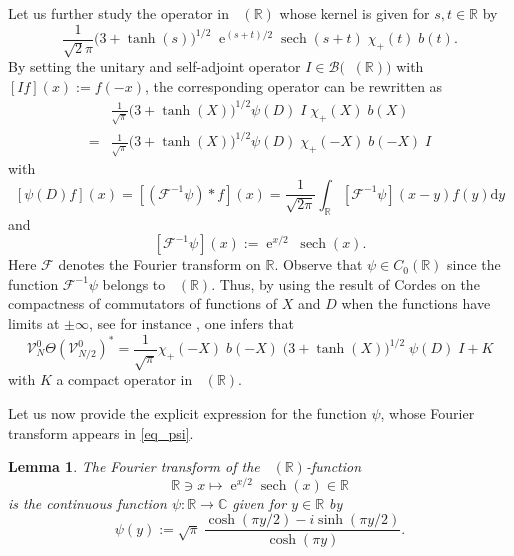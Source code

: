 \documentclass[11pt]{article}
\def\B{\mathscr B}
\def\C{\mathbb C}
\def\d{\mathrm d}
\def\F{\mathscr F}
\def\R{\mathbb R}
\def\V{\mathcal V}
\def\e{\mathop{\mathrm{e}}\nolimits}
\def\lone{\mathop{\mathrm{L}^1}\nolimits}
\def\ltwo{\mathop{\mathrm{L}^2}\nolimits}
\def\sech{\mathop{\mathrm{sech}}\nolimits}
\newtheorem{Lemma}[Theorem]{Lemma}
\begin{document}
Let us further study the operator in $\ltwo(\R)$ whose kernel is given for $s,t\in \R$ by
$$
\frac{1}{\sqrt{2}\pi}\big(3+\tanh(s)\big)^{1/2}\;\!
\e^{(s+t)/2}\sech(s+t)\;\! \chi_+(t)\;\! b(t).
$$
By setting the unitary and self-adjoint operator $I\in \B\big(\ltwo(\R)\big)$ with $[If](x):=f(-x)$, 
the corresponding operator can be rewritten as
\begin{align*}
& \frac{1}{\sqrt{\pi}} \big(3+\tanh(X)\big)^{1/2} \psi(D)\;\!I\;\!\chi_+(X) \;\!b(X) \\
= & \frac{1}{\sqrt{\pi}} \big(3+\tanh(X)\big)^{1/2} \psi(D)\;\!\chi_+(-X)\;\!b(-X)\;\! I
\end{align*}
with 
$$
[\psi(D)f](x)=[(\F^{-1}\psi)*f](x) = \frac{1}{\sqrt{2\pi}}\int_\R [\F^{-1}\psi](x-y)f(y) \d y
$$
and 
\begin{equation}\label{eq_psi}
[\F^{-1}{\psi}](x):=\e^{x/2}\;\!\sech(x).
\end{equation}
Here $\F$ denotes the Fourier transform on $\R$.
Observe that $\psi\in C_0(\R)$ since the function $\F^{-1}\psi$ belongs to $\lone(\R)$.
Thus, by using the result of Cordes on the compactness of commutators of functions of $X$ and $D$ when the functions have limits at $\pm \infty$, see for instance \cite[Thm.~4.1.10]{ABG}, one infers that
\begin{equation}\label{eq_op1}
\V^0_N \Theta(\V^0_{N/2})^*=
\frac{1}{\sqrt{\pi}} \chi_+(-X) \;\!b(-X)\;\! \big(3+\tanh(X)\big)^{1/2} \;\!\psi(D) \;\!I + K
\end{equation}
with $K$ a compact operator in $\ltwo(\R)$.

Let us now provide the explicit expression for the function $\psi$, whose Fourier transform
appears in \eqref{eq_psi}.

\begin{Lemma}
The Fourier transform of the $\lone(\R)$-function
$$
\R\ni x\mapsto \e^{x/2} \sech(x)\in \R
$$
is the continuous function $\psi:\R\to \C$ given for $y\in \R$ by
$$
\psi(y):=\sqrt{\pi}\ \frac{\cosh(\pi y/2)-i\sinh(\pi y/2)}{\cosh(\pi y)}.
$$
\end{Lemma}
\end{document}
